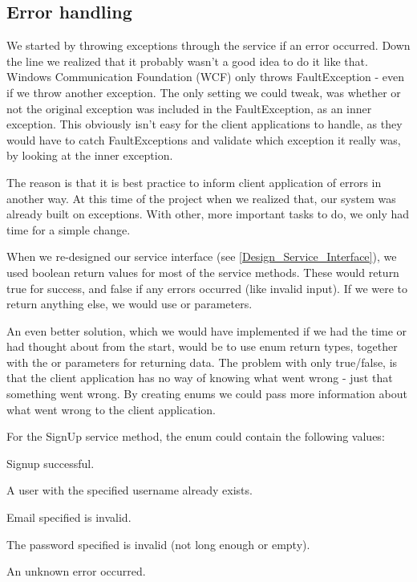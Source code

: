\subsection{Error handling}
\label{Implementation_Service_Error}

We started by throwing exceptions through the service if an error occurred. Down the line we realized that it probably wasn't a good idea to do it like that. Windows Communication Foundation (WCF) only throws FaultException - even if we throw another exception. The only setting we could tweak, was whether or not the original exception was included in the FaultException, as an inner exception. This obviously isn't easy for the client applications to handle, as they would have to catch FaultExceptions and validate which exception it really was, by looking at the inner exception.

The reason is that it is best practice to inform client application of errors in another way. At this time of the project when we realized that, our system was already built on exceptions. With other, more important tasks to do, we only had time for a simple change.

When we re-designed our service interface (see \ref{Design_Service_Interface}), we used boolean return values for most of the service methods. These would return true for success, and false if any errors occurred (like invalid input). If we were to return anything else, we would use  or  parameters.

An even better solution, which we would have implemented if we had the time or had thought about from the start, would be to use enum return types, together with the  or  parameters for returning data. The problem with only true/false, is that the client application has no way of knowing what went wrong - just that something went wrong. By creating enums we could pass more information about what went wrong to the client application.

For the SignUp service method, the enum could contain the following values:

\begin{my_description}
\item[Success] Signup successful.
\item[UsernameInUse] A user with the specified username already exists.
\item[InvalidEmail] Email specified is invalid.
\item[InvalidPassword] The password specified is invalid (not long enough or empty).
\item[Error] An unknown error occurred.
\end{my_description}
